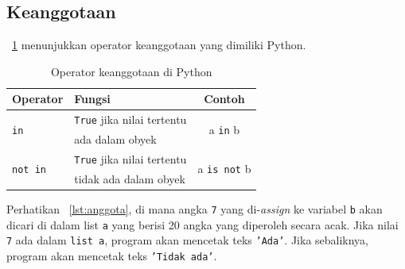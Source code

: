 \subsection{Keanggotaan}
\tablename~\ref{tab:anggota} menunjukkan operator keanggotaan yang dimiliki Python.

\begin{table}
\caption{Operator keanggotaan di Python}
\label{tab:anggota}
  \begin{center}
    \begin{tabular}{@{}llc@{}}\toprule
    Operator & Fungsi  & Contoh\\ \midrule
    \multirow{2}{*}{\texttt{in}} & \texttt{True} jika nilai tertentu  & \multirow{2}{*}{a \texttt{in} b} \\
    & ada dalam obyek & \\
    \multirow{2}{*}{\texttt{not in}} & \texttt{True} jika nilai tertentu & \multirow{2}{*}{a \texttt{is not} b} \\
    & tidak ada dalam obyek &\\
       \bottomrule
    \end{tabular}
  \end{center}
\end{table}

Perhatikan \lstlistingname~\ref{lst:anggota}, di mana angka \texttt{7} yang di-\textit{assign} ke variabel \texttt{b} akan dicari di dalam list \texttt{a} yang berisi 20 angka yang diperoleh secara acak. Jika nilai \texttt{7} ada dalam \texttt{list a}, program akan mencetak teks \texttt{'Ada'}. Jika sebaliknya, program akan mencetak teks \texttt{'Tidak ada'}.


